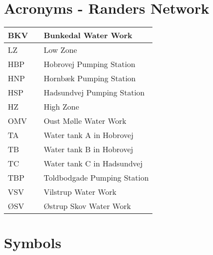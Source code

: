 \section*{Acronyms - Randers Network}
	
	\begin{tabular}{|l c l|} \hline
		BKV     &&	Bunkedal Water Work 									\\ \hline
		LZ      &&	Low Zone												\\ \hline
		HBP     &&	Hobrovej Pumping Station 								\\ \hline
		HNP     &&	Hornbæk Pumping Station 								\\ \hline
		HSP 	&&	Hadsundvej Pumping Station 								\\ \hline		
		HZ      &&	High Zone												\\ \hline
		OMV		&&	Oust Mølle Water Work 									\\ \hline
		TA 		&&	Water tank A in Hobrovej 								\\ \hline
		TB 		&&	Water tank B in Hobrovej 								\\ \hline
		TC 		&&	Water tank C in Hadsundvej 								\\ \hline
		TBP 	&&	Toldbodgade Pumping Station 							\\ \hline
		VSV 	&&	Vilstrup Water Work 									\\ \hline
		ØSV 	&&	Østrup Skov Water Work 									\\ \hline
	\end{tabular}

\newpage

\section*{Symbols}


